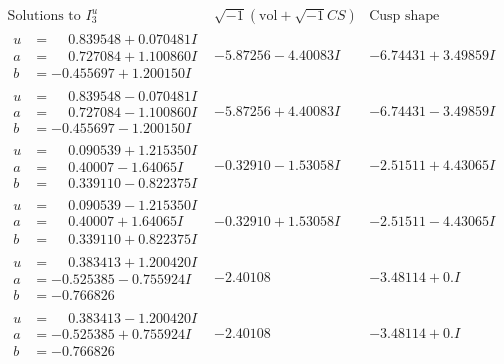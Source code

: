 \documentclass[1p]{elsarticle_modified}
\theoremstyle{definition}
\newcommand{\I}{\sqrt{-1}}
\begin{document}
$$\begin{array}{c|c|c}  
\text{Solutions to }I^u_{3}& \I (\text{vol} + \sqrt{-1}CS) & \text{Cusp shape}\\
 \hline 
\begin{aligned}
u &= \phantom{-}0.839548 + 0.070481 I \\
a &= \phantom{-}0.727084 + 1.100860 I \\
b &= -0.455697 + 1.200150 I\end{aligned}
 & -5.87256 - 4.40083 I & -6.74431 + 3.49859 I \\ \hline\begin{aligned}
u &= \phantom{-}0.839548 - 0.070481 I \\
a &= \phantom{-}0.727084 - 1.100860 I \\
b &= -0.455697 - 1.200150 I\end{aligned}
 & -5.87256 + 4.40083 I & -6.74431 - 3.49859 I \\ \hline\begin{aligned}
u &= \phantom{-}0.090539 + 1.215350 I \\
a &= \phantom{-}0.40007 - 1.64065 I \\
b &= \phantom{-}0.339110 - 0.822375 I\end{aligned}
 & -0.32910 - 1.53058 I & -2.51511 + 4.43065 I \\ \hline\begin{aligned}
u &= \phantom{-}0.090539 - 1.215350 I \\
a &= \phantom{-}0.40007 + 1.64065 I \\
b &= \phantom{-}0.339110 + 0.822375 I\end{aligned}
 & -0.32910 + 1.53058 I & -2.51511 - 4.43065 I \\ \hline\begin{aligned}
u &= \phantom{-}0.383413 + 1.200420 I \\
a &= -0.525385 - 0.755924 I \\
b &= -0.766826\phantom{ +0.000000I}\end{aligned}
 & -2.40108\phantom{ +0.000000I} & -3.48114 + 0. I\phantom{ +0.000000I} \\ \hline\begin{aligned}
u &= \phantom{-}0.383413 - 1.200420 I \\
a &= -0.525385 + 0.755924 I \\
b &= -0.766826\phantom{ +0.000000I}\end{aligned}
 & -2.40108\phantom{ +0.000000I} & -3.48114 + 0. I\phantom{ +0.000000I} \\ \hline\begin{aligned}

\end{aligned}
\end{array}$$
\end{document}
